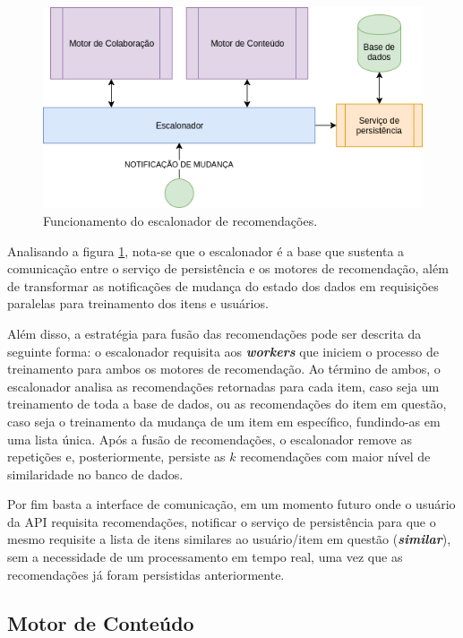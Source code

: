 \begin{figure}[h!tp]
	\caption{\label{scheduler}Funcionamento do escalonador de recomendações.}
	\begin{center}
		\includegraphics[scale=0.8]{images/scheduler.png}
	\end{center}
	\hspace{5.5cm}{Fonte: O Autor.}
\end{figure}

Analisando a figura \ref{scheduler}, nota-se que o escalonador é a base que sustenta a comunicação entre o serviço de persistência e os motores de recomendação, além de transformar as notificações de mudança do estado dos dados em requisições paralelas para treinamento dos itens e usuários.

Além disso, a estratégia para fusão das recomendações pode ser descrita da seguinte forma: o escalonador requisita aos \textbf{\textit{workers}} que iniciem o processo de treinamento para ambos os motores de recomendação. Ao término de ambos, o escalonador analisa as recomendações retornadas para cada item, caso seja um treinamento de toda a base de dados, ou as recomendações do item em questão, caso seja o treinamento da mudança de um item em específico, fundindo-as em uma lista única. Após a fusão de recomendações, o escalonador remove as repetições e, posteriormente, persiste as $k$ recomendações com maior nível de similaridade no banco de dados.

Por fim basta a interface de comunicação, em um momento futuro onde o usuário da API requisita recomendações, notificar o serviço de persistência para que o mesmo requisite a lista de itens similares ao usuário/item em questão (\textbf{\textit{similar}}), sem a necessidade de um processamento em tempo real, uma vez que as recomendações já foram persistidas anteriormente.

\subsection{Motor de Conteúdo} \label{motor:conteudo}

